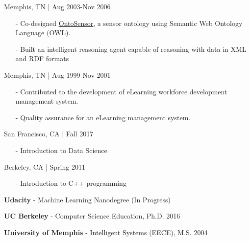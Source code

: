 \documentclass[11pt,article,oneside]{memoir}
\begin{document}
\begin{itemize}
\begin{itemize}
 \hfill Memphis, TN | Aug 2003-Nov 2006
\begin{itemize}[nolistsep]
\item[-]Co-designed \href{https://scholar.google.com/scholar?hl=en&q=Building+a+Sensor+Ontology\%3A+A+Practical+Approach+Leveraging+ISO+and+OGC+Models.&btnG=&as_sdt=1\%2C43&as_sdtp=}{OntoSensor}, a sensor ontology using Semantic Web Ontology Language (OWL).
\item[-]Built an intelligent reasoning agent capable of reasoning with data in XML and RDF formats
\end{itemize}

 \hfill Memphis, TN | Aug 1999-Nov 2001
\begin{itemize}[nolistsep]
\item[-]Contributed to the development of eLearning workforce development management system.
\item[-]Quality assurance for an eLearning management system.
\end{itemize} 

\bigskip 

\medskip

 \hfill San Francisco, CA | Fall 2017
\begin{itemize}[noitemsep,nolistsep]
\item[-] Introduction to Data Science
\end{itemize}

 \hfill Berkeley, CA | Spring 2011
\begin{itemize}[noitemsep,nolistsep] 
\item[-] Introduction to C++ programming
\end{itemize} 

\bigskip 


\ind \textbf{Udacity} - Machine Learning Nanodegree  \hfill (In Progress)

\ind \textbf{UC Berkeley} - Computer Science Education, Ph.D. \hfill 2016

\ind \textbf{University of Memphis} - Intelligent Systems (EECE), M.S. \hfill 2004


\end{itemize}
\end{itemize}
\end{document}
